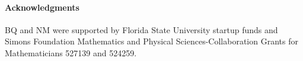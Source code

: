 \documentclass{jfm}
\begin{document}
\paragraph{\bf Acknowledgments} BQ and NM were supported by Florida
State University startup funds and Simons Foundation Mathematics and
Physical Sciences-Collaboration Grants for Mathematicians 527139 and
524259.

 











%
%
%
%
\end{document}
